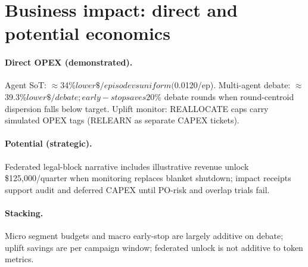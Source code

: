 \section{Business impact: direct and potential economics}

\paragraph{Direct OPEX (demonstrated).}
Agent SoT: $\approx$34\%$ lower \$/episode vs uniform ($0.0120/ep). Multi-agent debate: $\approx$39.3\%$ lower \$/debate; early-stop saves $\approx$20\%$ debate rounds when round-centroid dispersion falls below target. Uplift monitor: REALLOCATE caps carry simulated OPEX tags (RELEARN as separate CAPEX tickets).

\paragraph{Potential (strategic).}
Federated legal-block narrative includes illustrative revenue unlock \$125,000/quarter when monitoring replaces blanket shutdown; impact receipts support audit and deferred CAPEX until PO-risk and overlap trials fail.

\paragraph{Stacking.}
Micro segment budgets and macro early-stop are largely additive on debate; uplift savings are per campaign window; federated unlock is not additive to token metrics.

